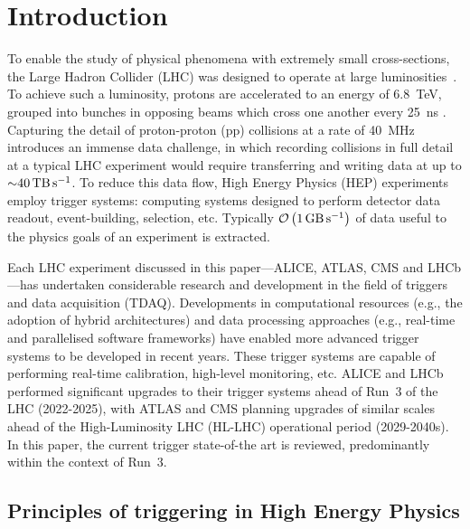 \section{Introduction}

To enable the study of physical phenomena with extremely small cross-sections, the Large Hadron Collider (LHC) was designed to operate at large luminosities~\cite{CERN:lhc-design-report}. To achieve such a luminosity, protons are accelerated to an energy of \SI{6.8}{\tera\electronvolt}, grouped into bunches in opposing beams which cross one another every \SI{25}{\nano\second} \cite{CERN:lhc-run3-operation}. Capturing the detail of proton-proton (pp) collisions at a rate of \SI{40}{\mega\hertz} introduces an immense data challenge, in which recording collisions in full detail at a typical LHC experiment would require transferring and writing data at up to ${\sim}\SI{40}{\tera\byte\per\second}$. To reduce this data flow, High Energy Physics (HEP) experiments employ trigger systems: computing systems designed to perform detector data readout, event-building, selection, etc. Typically $\mathcal{O}\left(\SI{1}{\giga\byte\per\second}\right)$ of data useful to the physics goals of an experiment is extracted.

Each LHC experiment discussed in this paper—ALICE, ATLAS, CMS and LHCb—has undertaken considerable research and development in the field of triggers and data acquisition (TDAQ). Developments in computational resources (e.g., the adoption of hybrid architectures) and data processing approaches (e.g., real-time and parallelised software frameworks) have enabled more advanced trigger systems to be developed in recent years. These trigger systems are capable of performing real-time calibration, high-level monitoring, etc. ALICE and LHCb performed significant upgrades to their trigger systems ahead of Run~3 of the LHC (2022-2025), with ATLAS and CMS planning upgrades of similar scales ahead of the High-Luminosity LHC (HL-LHC) operational period (2029-2040s). In this paper, the current trigger state-of-the art is reviewed, predominantly within the context of Run~3.

\subsection{Principles of triggering in High Energy Physics}

